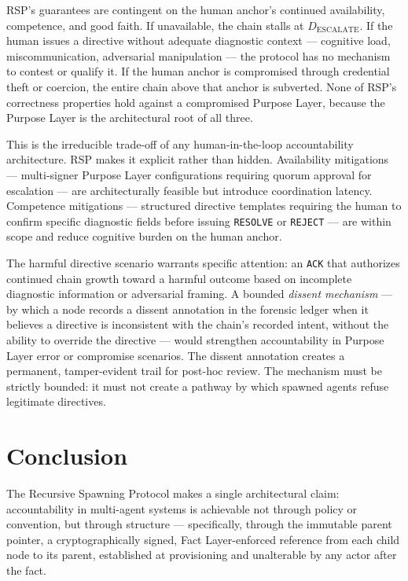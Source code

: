 RSP's guarantees are contingent on the human anchor's continued availability, competence, and good faith. If unavailable, the chain stalls at $D_{\text{ESCALATE}}$. If the human issues a directive without adequate diagnostic context — cognitive load, miscommunication, adversarial manipulation — the protocol has no mechanism to contest or qualify it. If the human anchor is compromised through credential theft or coercion, the entire chain above that anchor is subverted. None of RSP's correctness properties hold against a compromised Purpose Layer, because the Purpose Layer is the architectural root of all three.

This is the irreducible trade-off of any human-in-the-loop accountability architecture. RSP makes it explicit rather than hidden. Availability mitigations — multi-signer Purpose Layer configurations requiring quorum approval for escalation — are architecturally feasible but introduce coordination latency. Competence mitigations — structured directive templates requiring the human to confirm specific diagnostic fields before issuing \texttt{RESOLVE} or \texttt{REJECT} — are within scope and reduce cognitive burden on the human anchor.

The harmful directive scenario warrants specific attention: an \texttt{ACK} that authorizes continued chain growth toward a harmful outcome based on incomplete diagnostic information or adversarial framing. A bounded \emph{dissent mechanism} — by which a node records a dissent annotation in the forensic ledger when it believes a directive is inconsistent with the chain's recorded intent, without the ability to override the directive — would strengthen accountability in Purpose Layer error or compromise scenarios. The dissent annotation creates a permanent, tamper-evident trail for post-hoc review. The mechanism must be strictly bounded: it must not create a pathway by which spawned agents refuse legitimate directives.

\clearpage
\section{Conclusion}
\label{sec:rs-conclusion}

The Recursive Spawning Protocol makes a single architectural claim: accountability in multi-agent systems is achievable not through policy or convention, but through structure — specifically, through the immutable parent pointer, a cryptographically signed, Fact Layer-enforced reference from each child node to its parent, established at provisioning and unalterable by any actor after the fact.

